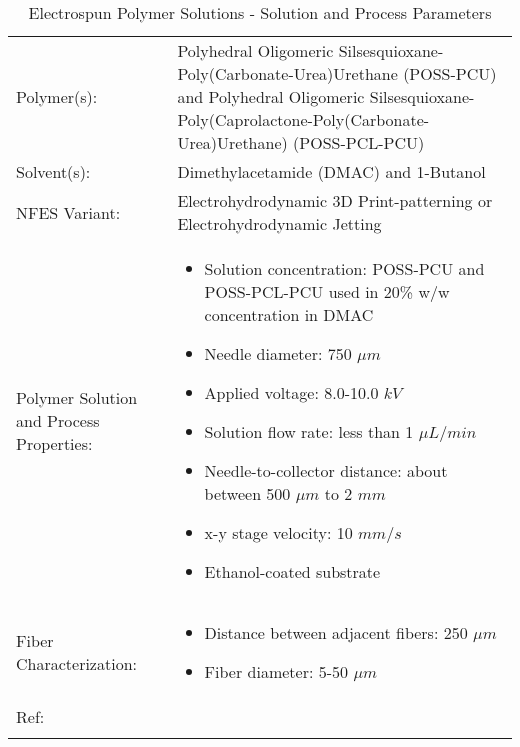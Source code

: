 \begin{table}[th]
\caption{Electrospun Polymer Solutions - Solution and Process Parameters}
\begin{center}
\begin{tabular}{
>{\raggedright\arraybackslash}p{}
>{\raggedright\arraybackslash}p{} }

\hline
Polymer(s): &
Polyhedral Oligomeric Silsesquioxane-Poly(Carbonate-Urea)Urethane (POSS-PCU) and Polyhedral Oligomeric Silsesquioxane-Poly(Caprolactone-Poly(Carbonate-Urea)Urethane) (POSS-PCL-PCU)\\

\arrayrulecolor{lightgray}\hline
Solvent(s): &
Dimethylacetamide (DMAC) and 1-Butanol \\

\hline
NFES Variant: &
Electrohydrodynamic 3D Print-patterning or Electrohydrodynamic Jetting \\

\hline
Polymer Solution and Process Properties: &
\begin{itemize}[leftmargin=*]
\item Solution concentration: POSS-PCU and POSS-PCL-PCU used in 20\% w/w concentration in DMAC
\item Needle diameter: 750 $\mu m$
\item Applied voltage: 8.0-10.0 $k V$
\item Solution flow rate: less than 1 $\mu L / min$
\item Needle-to-collector distance: about between 500 $\mu m$ to 2 $m m$
\item x-y stage velocity: 10 $m m / s$
\item Ethanol-coated substrate
\end{itemize} \\

\hline
Fiber Characterization: &
\begin{itemize}[leftmargin=*]
\item Distance between adjacent fibers: 250 $\mu m$
\item Fiber diameter: 5-50 $\mu m$
\end{itemize} \\

\hline
Ref: & \cite{Gupta2007} \\ %
\arrayrulecolor{black}\hline
\label{tbl:FloresCompare}
\end{tabular}
\end{center}
\end{table}

